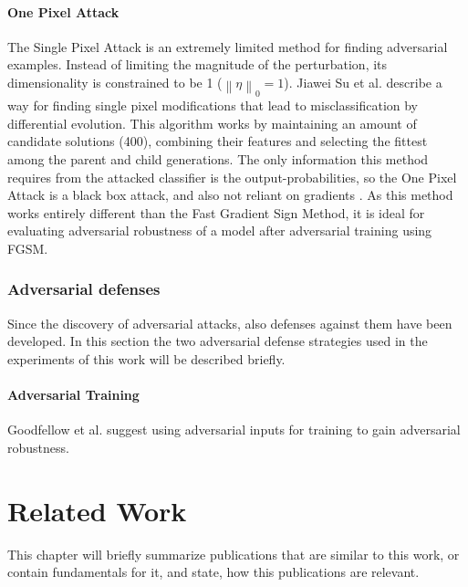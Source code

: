 \documentclass[draft,final]{vutinfth} %
\newcommand{\norm}[1]{\left\lVert#1\right\rVert}
\begin{document}
\subsubsection{One Pixel Attack}

The Single Pixel Attack is an extremely limited method for finding adversarial examples.
Instead of limiting the magnitude of the perturbation, its dimensionality is constrained to be 1 ($\norm{\eta}_0=1$).
Jiawei Su et al. describe a way for finding single pixel modifications that lead to misclassification by differential evolution.
This algorithm works by maintaining an amount of candidate solutions (400), combining their features and selecting the fittest among the parent and child generations.
The only information this method requires from the attacked classifier is the output-probabilities, so the One Pixel Attack is a black box attack, and also not reliant on gradients \cite{Jiawei2017}.
As this method works entirely different than the Fast Gradient Sign Method, it is ideal for evaluating adversarial robustness of a model after adversarial training using FGSM.

\subsection{Adversarial defenses}

Since the discovery of adversarial attacks, also defenses against them have been developed.
In this section the two adversarial defense strategies used in the experiments of this work will be described briefly.

\subsubsection{Adversarial Training}

Goodfellow et al. suggest using adversarial inputs for training to gain adversarial robustness.

\cite{Goodfellow2015}

\chapter{Related Work}

This chapter will briefly summarize publications that are similar to this work, or contain fundamentals for it, and state, how this publications are relevant.
\end{document}
